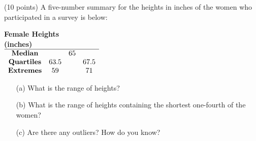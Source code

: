 \documentclass[12pt]{amsart}
\begin{document}
\vspace{.8in}

\begin{thm} (10 points) A five-number summary for the heights in inches of the women who participated in a survey is below:
\begin{center}
{\bf Female Heights\\ (inches)}\\
$\begin{array}{cccc}\hline
{\text{\bf{Median}}} & & 65& \\
{\text{\bf{Quartiles}}} & 63.5 & & 67.5 \\
{\text{\bf{Extremes}}} & 59 & & 71\\
\end{array}$
\end{center}
\begin{itemize}
\item[(a)] What is the range of heights?

\vspace{1in}

\item[(b)] What is the range of heights containing the shortest one-fourth of the women?

\vspace{1in}

\item[(c)] Are there any outliers? How do you know?

\end{itemize}
\end{thm}
\end{document}
